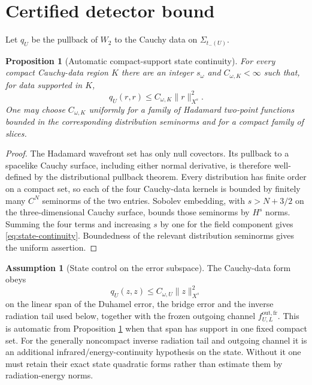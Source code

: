 \documentclass[11pt,a4paper]{article}
\newtheorem{proposition}[theorem]{Proposition}
\theoremstyle{definition}
\newtheorem{assumption}[theorem]{Assumption}
\theoremstyle{remark}
\begin{document}
	\section{Certified detector bound}
	\label{sec:certified-bound}
	\label{sec:conditional-result}
	
	Let $q_U$ be the pullback of $W_2$ to the Cauchy data on
	$\Sigma_{t_-(U)}$.
	
	\begin{proposition}[Automatic compact-support state continuity]
		\label{prop:state-continuity}
		For every compact Cauchy-data region $K$ there are an integer $s_\omega$ and
		$C_{\omega,K}<\infty$ such that, for data supported in $K$,
		\begin{equation}
			q_U(r,r)\leq C_{\omega,K}\|r\|_{X^s}^2.
			\label{eq:state-continuity}
		\end{equation}
		One may choose $C_{\omega,K}$ uniformly for a family of Hadamard two-point
		functions bounded in the corresponding distribution seminorms and for a
		compact family of slices.
	\end{proposition}
	
	\begin{proof}
		The Hadamard wavefront set has only null covectors.  Its pullback to a
		spacelike Cauchy surface, including either normal derivative, is therefore
		well-defined by the distributional pullback theorem.  Every distribution has
		finite order on a compact set, so each of the four Cauchy-data kernels is
		bounded by finitely many $C^N$ seminorms of the two entries.  Sobolev
		embedding, with $s>N+3/2$ on the three-dimensional Cauchy surface, bounds
		those seminorms by $H^s$ norms.  Summing the four terms and increasing $s$ by
		one for the field component gives
		\eqref{eq:state-continuity}.  Boundedness of the relevant distribution
		seminorms gives the uniform assertion.
	\end{proof}
	
	\begin{assumption}[State control on the error subspace]
		\label{ass:state-energy-control}
		The Cauchy-data form obeys
		\begin{equation}
			q_U(z,z)\leq C_{\omega,U}\|z\|_{X^s}^2
			\label{eq:global-state-energy-control}
		\end{equation}
		on the linear span of the Duhamel error, the bridge error and the inverse
		radiation tail used below, together with the frozen outgoing channel
		$f^{\mathrm{out,fr}}_{U,L}$.  This is automatic from Proposition
		\ref{prop:state-continuity} when that span has support in one fixed compact
		set.  For the generally noncompact inverse radiation tail and outgoing
		channel it is an additional infrared/energy-continuity hypothesis on the
		state.  Without it one must retain their exact state quadratic forms rather
		than estimate them by radiation-energy norms.
	\end{assumption}
	
\end{document}
